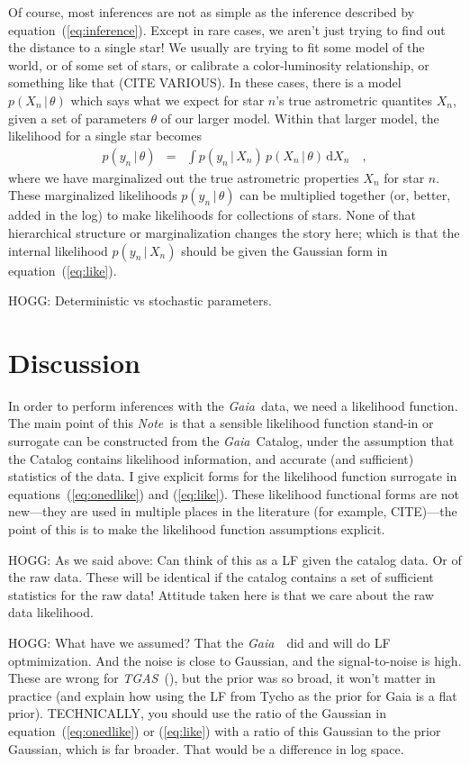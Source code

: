 \documentclass[12pt, modern]{aastex62}
\newcommand{\acronym}[1]{{\small{#1}}}
\newcommand{\Gaia}{\textsl{Gaia}}
\newcommand{\TGAS}{\textsl{\acronym{TGAS}}}
\newcommand{\documentname}{\textsl{Note}}
\newcommand{\equationname}{equation}
\newcommand{\dd}{\mathrm{d}}
\newcommand{\given}{\,|\,}
\begin{document}
Of course, most inferences are not as simple as the inference described by
\equationname~(\ref{eq:inference}).
Except in rare cases, we aren't just trying to find out the distance to a single
star!
We usually are trying to fit some model of the world, or of some set of stars,
or calibrate a color-luminosity relationship, or something like that (CITE VARIOUS).
In these cases, there is a model $p(X_n\given\theta)$ which says what we expect
for star $n$'s true astrometric quantites $X_n$, given a set of parameters $\theta$
of our larger model.
Within that larger model, the likelihood for a single star becomes
\begin{eqnarray}
p(y_n\given\theta) &=& \int p(y_n\given X_n)\,p(X_n\given\theta)\,\dd X_n
\quad ,
\end{eqnarray}
where we have marginalized out the true astrometric properties $X_n$ for star $n$.
These marginalized likelihoods $p(y_n\given\theta)$
can be multiplied together (or, better, added in the log)
to make likelihoods for collections of stars.
None of that hierarchical structure or marginalization changes the story here;
which is that the internal likelihood $p(y_n\given X_n)$ should be given the
Gaussian form in \equationname~(\ref{eq:like}).

HOGG: Deterministic vs stochastic parameters.

\section{Discussion}
In order to perform inferences
with the \Gaia\ data, we need a likelihood function.
The main point of this \documentname\ is that a sensible likelihood function
stand-in or surrogate can be constructed from the \Gaia\ Catalog, under the assumption
that the Catalog contains likelihood information, and accurate (and sufficient)
statistics of the data.
I give explicit forms for the likelihood function surrogate in
\equationname s~(\ref{eq:onedlike}) and (\ref{eq:like}).
These likelihood functional forms are not new---they are used in multiple places
in the literature (for example, CITE)---the point of this is to make the
likelihood function assumptions explicit.

HOGG: As we said above: Can think of this as a LF given the catalog data. Or of the raw data.
These will be identical if the catalog contains a set of sufficient statistics
for the raw data!
Attitude taken here is that we care about the raw data likelihood.

HOGG: What have we assumed? That the \Gaia\ \DPAC\ did and will do LF optmimization.
And the
noise is close to Gaussian, and the signal-to-noise is high. These are wrong for
\TGAS\ (\citealt{michalik, dr1}), but the prior was so broad, it won't matter in practice (and explain how using the LF from Tycho as the prior for Gaia is a flat prior). TECHNICALLY, you should use
the ratio of the Gaussian in \equationname~(\ref{eq:onedlike}) or (\ref{eq:like}) with
a ratio of this Gaussian to the prior Gaussian, which is far broader. That would be
a difference in log space.
\end{document}
